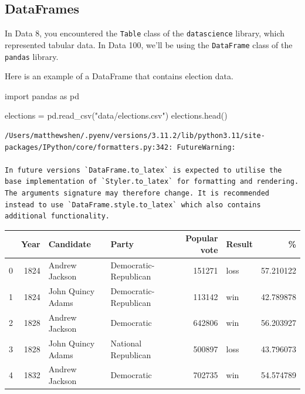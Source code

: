 \documentclass[
  letterpaper,
  DIV=11,
  numbers=noendperiod]{scrreprt}
\newenvironment{Shaded}{\begin{snugshade}}{\end{snugshade}}
\newcommand{\ImportTok}[1]{\textcolor[rgb]{0.00,0.46,0.62}{#1}}
\newcommand{\NormalTok}[1]{\textcolor[rgb]{0.00,0.23,0.31}{#1}}
\newcommand{\OperatorTok}[1]{\textcolor[rgb]{0.37,0.37,0.37}{#1}}
\newcommand{\StringTok}[1]{\textcolor[rgb]{0.13,0.47,0.30}{#1}}
\begin{document}
\hypertarget{dataframes}{%
\subsection{DataFrames}\label{dataframes}}

In Data 8, you encountered the \texttt{Table} class of the
\texttt{datascience} library, which represented tabular data. In Data
100, we'll be using the \texttt{DataFrame} class of the \texttt{pandas}
library.

Here is an example of a DataFrame that contains election data.

\begin{Shaded}
\begin{Highlighting}[]
\ImportTok{import}\NormalTok{ pandas }\ImportTok{as}\NormalTok{ pd}

\NormalTok{elections }\OperatorTok{=}\NormalTok{ pd.read\_csv(}\StringTok{"data/elections.csv"}\NormalTok{)}
\NormalTok{elections.head()}
\end{Highlighting}
\end{Shaded}

\begin{verbatim}
/Users/matthewshen/.pyenv/versions/3.11.2/lib/python3.11/site-packages/IPython/core/formatters.py:342: FutureWarning:

In future versions `DataFrame.to_latex` is expected to utilise the base implementation of `Styler.to_latex` for formatting and rendering. The arguments signature may therefore change. It is recommended instead to use `DataFrame.style.to_latex` which also contains additional functionality.
\end{verbatim}

\begin{tabular}{lrllrlr}
\toprule
{} &  Year &          Candidate &                  Party &  Popular vote & Result &          \% \\
\midrule
0 &  1824 &     Andrew Jackson &  Democratic-Republican &        151271 &   loss &  57.210122 \\
1 &  1824 &  John Quincy Adams &  Democratic-Republican &        113142 &    win &  42.789878 \\
2 &  1828 &     Andrew Jackson &             Democratic &        642806 &    win &  56.203927 \\
3 &  1828 &  John Quincy Adams &    National Republican &        500897 &   loss &  43.796073 \\
4 &  1832 &     Andrew Jackson &             Democratic &        702735 &    win &  54.574789 \\
\bottomrule
\end{tabular}
\end{document}

